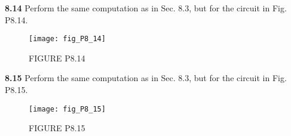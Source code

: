 \documentclass[../main.tex]{subfiles}
\begin{document}
\begin{multicols}{2}
    \noindent \textbf{8.14} Perform the same computation as in Sec. 8.3, but for the circuit in Fig. P8.14.
    
    \begin{figure}[H]
        \centering
        \texttt{[image: fig\_P8\_14]}
        \caption{\textsf{FIGURE P8.14}}
        \label{fig:fig_P8_14}
    \end{figure}

    \noindent \textbf{8.15} Perform the same computation as in Sec. 8.3, but for the circuit in Fig. P8.15.

    \begin{figure}[H]
        \centering
        \texttt{[image: fig\_P8\_15]}
        \caption{\textsf{FIGURE P8.15}}
        \label{fig:fig_P8_15}
    \end{figure}

\end{multicols}
\end{document}

